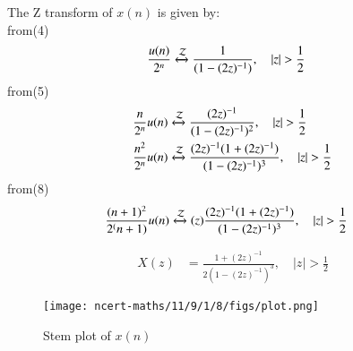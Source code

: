 \documentclass[journal,12pt,twocolumn]{IEEEtran}
\theoremstyle{remark}
\begin{document}
The Z transform of $x(n)$ is given by:\\
from(4)
\begin{align}
\frac{u(n)}{2^n} & \xleftrightarrow{\mathcal{Z}}  \frac{1}{(1-(2z)^{-1})}, \quad \lvert z \rvert>\frac{1}{2}
\end{align}
	from(5)
\begin{align}
\frac{n}{2^n} u(n) & \xleftrightarrow{\mathcal{Z}} \frac{(2z)^{-1}}{(1-(2z)^{-1})^2}, \quad \lvert z \rvert>\frac{1}{2}\\
\frac{n^2}{2^n} u(n) & \xleftrightarrow{\mathcal{Z}} \frac{(2z)^{-1}(1 + (2z)^{-1})}{(1 - (2z)^{-1})^3}, \quad \lvert z \rvert>\frac{1}{2}
\end{align}
	from(8)
\begin{align}
\frac{(n+1)^2}{2^(n+1)} u(n) & \xleftrightarrow{\mathcal{Z}} (z) \frac{(2z)^{-1}(1 + (2z)^{-1})}{(1 - (2z)^{-1})^3}, \quad \lvert z \rvert > \frac{1}{2}
\end{align}

\begin{align}
X(z) &= \frac{1 + (2z)^{-1}}{2(1 - (2z)^{-1})^3}, \quad \lvert z \rvert > \frac{1}{2}
\end{align}

\begin{figure}[h!]
    \centering
    \texttt{[image: ncert-maths/11/9/1/8/figs/plot.png]}
    \caption{Stem plot of $x(n)$}
    \label{fig:1}
\end{figure}

\end{document}
